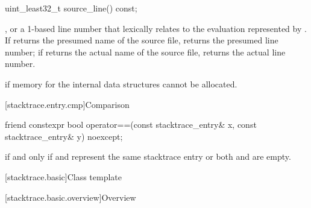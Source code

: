 %
\begin{itemdecl}
uint_least32_t source_line() const;
\end{itemdecl}

\begin{itemdescr}
\pnum
\returns
{}, or a 1-based line number that lexically relates to the evaluation
represented by .
If  returns the presumed name of the source file,
returns the presumed line number;
if  returns the actual name of the source file,
returns the actual line number.

\pnum
\throws
{} if memory for
the internal data structures cannot be allocated.
\end{itemdescr}

[stacktrace.entry.cmp]{Comparison}

%
\begin{itemdecl}
friend constexpr bool operator==(const stacktrace_entry& x, const stacktrace_entry& y) noexcept;
\end{itemdecl}

\begin{itemdescr}
\pnum
\returns
{} if and only if  and  represent
the same stacktrace entry or both  and  are empty.
\end{itemdescr}

[stacktrace.basic]{Class template }

[stacktrace.basic.overview]{Overview}

